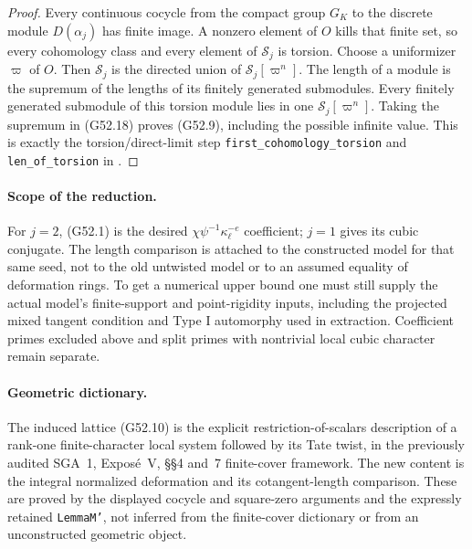 \begin{proof}
Every continuous cocycle from the compact group $G_K$
to the discrete module $D(\alpha_j)$ has finite image.
A nonzero element of $O$ kills that finite set, so
every cohomology class and every element of
$\mathcal S_j$ is torsion.
Choose a uniformizer $\varpi$ of $O$.  Then
$\mathcal S_j$ is the directed union of
$\mathcal S_j[\varpi^n]$.
The length of a module is the supremum of the lengths
of its finitely generated submodules.  Every finitely
generated submodule of this torsion module lies in
one $\mathcal S_j[\varpi^n]$.
Taking the supremum in (G52.18) proves (G52.9), including
the possible infinite value.
This is exactly the torsion/direct-limit step
\texttt{first\_cohomology\_torsion} and
\texttt{len\_of\_torsion} in
.
\end{proof}

\paragraph{Scope of the reduction.}
For $j=2$, (G52.1) is the desired
$\chi\psi^{-1}\kappa_\ell^{-e}$ coefficient; $j=1$
gives its cubic conjugate.
The length comparison is attached to the constructed
model for that same seed, not to the old untwisted
model or to an assumed equality of deformation rings.
To get a numerical upper bound one must still supply
the actual model's finite-support and point-rigidity
inputs, including the projected mixed tangent
condition and Type I automorphy used in extraction.
Coefficient primes excluded above and split primes
with nontrivial local cubic character remain separate.

\paragraph{Geometric dictionary.}
The induced lattice (G52.10) is the explicit
restriction-of-scalars description of a rank-one
finite-character local system followed by its Tate
twist, in the previously audited SGA~1, Expos\'e~V,
\S\S4 and~7 finite-cover framework.
The new content is the integral normalized deformation
and its cotangent-length comparison.  These are proved
by the displayed cocycle and square-zero arguments and
the expressly retained \texttt{LemmaM'}, not inferred
from the finite-cover dictionary or from an unconstructed
geometric object.
